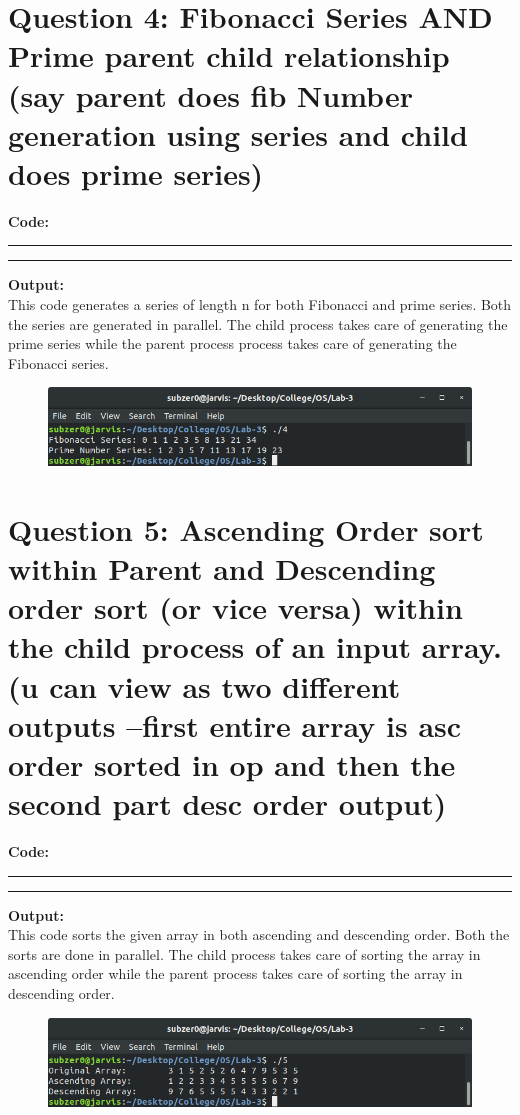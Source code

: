 \documentclass{article}
\begin{document}
\section*{Question 4: Fibonacci Series AND Prime parent child relationship (say parent does fib Number generation using series and child does prime series)}

\bigskip

\textbf{\LARGE Code:}
\smallskip
\par\noindent\rule{\textwidth}{0.4pt}

\par\noindent\rule{\textwidth}{0.4pt}

\bigskip
\noindent
\textbf{\LARGE Output:}
\bigskip \\This code generates a series of length n for both Fibonacci
and prime series. Both the series are generated in parallel. The child
process takes care of generating the prime series while the parent process
process takes care of generating the Fibonacci series.

\begin{figure}[ht]  
  \includegraphics[width=\textwidth]{output/4.png}
\end{figure}


\section*{Question 5: Ascending Order sort within Parent and Descending order sort (or vice versa) within the child process of an input array. (u can view as two different outputs –first entire array is asc order sorted in op and then the second part desc order output)}

\bigskip

\textbf{\LARGE Code:}
\smallskip
\par\noindent\rule{\textwidth}{0.4pt}

\par\noindent\rule{\textwidth}{0.4pt}

\bigskip
\noindent
\textbf{\LARGE Output:}
\bigskip \\This code sorts the given array in both ascending and descending
order. Both the sorts are done in parallel. The child process takes care of 
sorting the array in ascending order while the parent process takes care of
sorting the array in descending order.
\begin{figure}[ht]
    \includegraphics[width=\textwidth]{output/5.png}
\end{figure}
\end{document}
